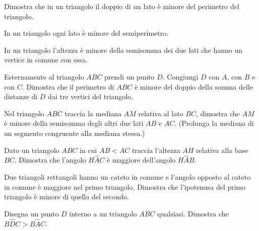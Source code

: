 \begin{multicols}{2}
\begin{multicols}{2}
\begin{esercizio}
\label{ese:3.87}
Dimostra che in un triangolo il doppio di un lato è minore del 
perimetro del triangolo. 
\end{esercizio}

\begin{esercizio}
\label{ese:3.92}
In un triangolo ogni lato è minore del semiperimetro.
\end{esercizio}

\begin{esercizio}
\label{ese:3.93}
In un triangolo l'altezza è minore della semisomma dei due lati che 
hanno un vertice in comune con essa.
\end{esercizio}

\begin{esercizio}
\label{ese:3.98}
Esternamente al triangolo $ABC$ prendi un punto $D$. Congiungi $D$ 
con $A$, con $B$ e con $C$. Dimostra che il perimetro di $ABC$ è 
minore del doppio della somma delle distanze di $D$ dai tre vertici 
del triangolo.
\end{esercizio}

\begin{esercizio}
\label{ese:3.99}
Nel triangolo $ABC$ traccia la mediana $AM$ relativa al lato $BC$, 
dimostra che $AM$ è minore della semisomma degli altri due lati $AB$ 
e $AC$. (Prolunga la mediana di un segmento congruente alla mediana 
stessa.)
\end{esercizio}

\begin{esercizio}
\label{ese:3.102}
Dato un triangolo $ABC$ in cui $AB<AC$ traccia l'altezza $AH$ 
relativa alla base $BC$. Dimostra che l'angolo $H\widehat{A}C$ è 
maggiore dell'angolo $H\widehat{A}B$.
\end{esercizio}

\begin{esercizio}
\label{ese:3.106}
Due triangoli rettangoli hanno un cateto in comune e l'angolo opposto 
al cateto in comune è maggiore nel primo triangolo. Dimostra che 
l'ipotenusa del primo triangolo è minore di quella del secondo.
\end{esercizio}

\begin{esercizio}
\label{ese:3.109}
Disegna un punto $D$ interno a un triangolo $ABC$ qualsiasi. Dimostra 
che $B\widehat{D}C>B\widehat{A}C$.
\end{esercizio}

\end{multicols}


\end{multicols}
